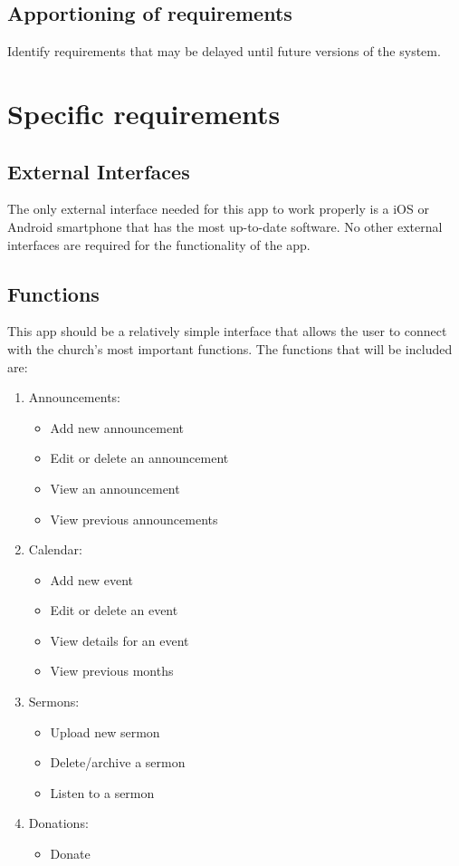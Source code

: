 \documentclass[letterpaper,10pt,draftclsnofoot,onecolumn,titlepage]{IEEEtran}
\begin{document}
	\subsection{Apportioning of requirements}
	Identify requirements that may be delayed until future versions of the system.

	\section{Specific requirements}
	\subsection{External Interfaces}
	The only external interface needed for this app to work properly is a iOS or Android smartphone that has the most up-to-date software.
	No other external interfaces are required for the functionality of the app.

	\subsection{Functions}
	This app should be a relatively simple interface that allows the user to connect with the church's most important functions.
	The functions that will be included are:
	\begin{enumerate}
		\item{Announcements:}
			\begin{itemize}
				\item{Add new announcement}
				\item{Edit or delete an announcement}
				\item{View an announcement}
				\item{View previous announcements}
			\end{itemize}
		\item{Calendar:}
			\begin{itemize}
				\item{Add new event}
				\item{Edit or delete an event}
				\item{View details for an event}
				\item{View previous months}
			\end{itemize}
		\item{Sermons:}
			\begin{itemize}
				\item{Upload new sermon}
				\item{Delete/archive a sermon}
				\item{Listen to a sermon}
			\end{itemize}
		\item{Donations:}
			\begin{itemize}
				\item{Donate}
			\end{itemize}
	\end{enumerate}
\end{document}
